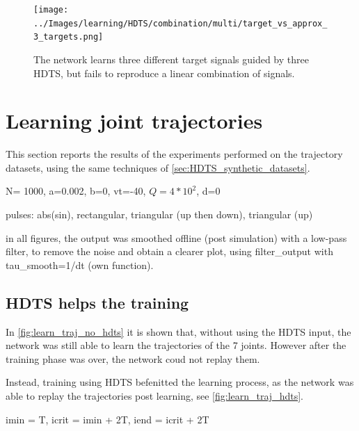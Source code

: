 \documentclass[10pt,a4paper, final]{report} %
\begin{document}

\begin{figure}[H]
\texttt{[image: ../Images/learning/HDTS/combination/multi/target\_vs\_approx\_3\_targets.png]} 
\caption{The network learns three different target signals guided by three HDTS, but fails to reproduce a linear combination of signals.}
\label{fig:HDTS_interpolation_three_signals}
\end{figure}

\section{Learning joint trajectories}
\label{sec:HDTS_trajectory_datasets}
This section reports the results of the experiments performed on the trajectory datasets, using the same techniques of \autoref{sec:HDTS_synthetic_datasets}.

N= 1000, a=0.002, b=0, vt=-40, $Q=4*10^2$, d=0

pulses: abs(sin), rectangular, triangular (up then down), triangular (up)

in all figures, the output was smoothed offline (post simulation) with a low-pass filter, to remove the noise and obtain a clearer plot, using filter\_output with tau\_smooth=1/dt (own function).

\subsection{HDTS helps the training}


In \autoref{fig:learn_traj_no_hdts} it is shown that, without using the HDTS input, the network was still able to learn the trajectories of the 7 joints. However after the training phase was over, the network coud not replay them. 

Instead, training using HDTS befenitted the learning process, as the network was able to replay the trajectories post learning, see \autoref{fig:learn_traj_hdts}. 




imin = T, icrit = imin + 2T, iend = icrit + 2T
\end{document}
